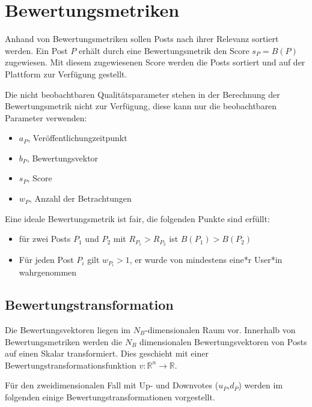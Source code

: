 \chapter{Bewertungsmetriken}
\label{chapter:bewertungsmetriken}

Anhand von Bewertungsmetriken sollen Posts nach ihrer Relevanz sortiert werden. Ein Post $P$ erhält durch eine Bewertungsmetrik den Score $s_P = B(P)$ zugewiesen. Mit diesem zugewiesenen Score werden die Posts sortiert und auf der Plattform zur Verfügung gestellt.


Die nicht beobachtbaren Qualitätsparameter stehen in der Berechnung der Bewertungsmetrik nicht zur Verfügung, diese kann nur die beobachtbaren Parameter verwenden:

\begin{itemize}
	\item $a_P$, Veröffentlichungzeitpunkt
	\item $b_P$, Bewertungsvektor
	\item $s_P$, Score
	\item $w_P$, Anzahl der Betrachtungen
\end{itemize}

Eine ideale Bewertungsmetrik ist fair, die folgenden Punkte sind erfüllt:

\begin{itemize}
	\item für zwei Posts $P_1$ und $P_2$ mit $R_{P_1} > R_{P_2}$ ist $B(P_1) > B(P_2)$
	\item Für jeden Post $P_i$ gilt $w_{P_i} > 1$, er wurde von mindestens eine*r User*in wahrgenommen
\end{itemize}

\section{Bewertungstransformation}
\label{voteevaluation}

Die Bewertungsvektoren liegen im $N_B$-dimensionalen Raum vor. Innerhalb von Bewertungsmetriken werden die $N_B$ dimensionalen Bewertungsvektoren von Posts auf einen Skalar transformiert. Dies geschieht mit einer Bewertungstransformationsfunktion $v: \mathbb{R}^{n} \rightarrow \mathbb{R}$.

Für den zweidimensionalen Fall mit Up- und Downvotes ($u_P$,$d_P$) werden im folgenden einige Bewertungstransformationen vorgestellt.

